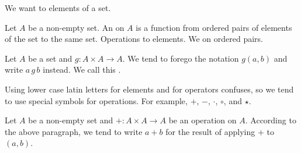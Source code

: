 

We want to 
elements of a set.


Let $A$ be a non-empty set.
An  on $A$ is
a function from ordered pairs of elements
of the set to the same set.
Operations to  elements.
We  on ordered pairs.


Let $A$ be a set and
$g: A \times A \to A$.
We tend to forego the notation
$g(a, b)$ and
write $a\,g\,b$ instead.
We call this
.

Using lower case latin
letters for elements and for operators
confuses, so we tend to use
special symbols for operations.
For example,
$+$, $-$, $\cdot$, $\circ$, and $\star$.

Let $A$ be a non-empty set
and $+: A \times A \to A$ be
an operation on $A$.
According to the above paragraph,
we tend to write
$a+b$ for the result of applying $+$
to $(a,b)$.

\blankpage